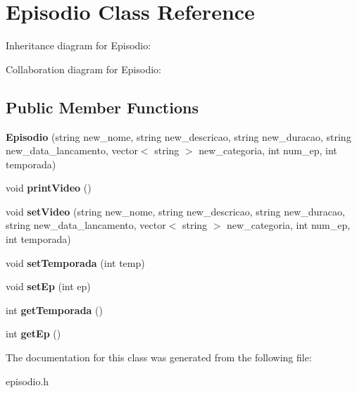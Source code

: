 \hypertarget{classEpisodio}{}\section{Episodio Class Reference}
\label{classEpisodio}


Inheritance diagram for Episodio\+:


Collaboration diagram for Episodio\+:
\subsection*{Public Member Functions}
\begin{DoxyCompactItemize}
\item 
{\bfseries Episodio} (string new\+\_\+nome, string new\+\_\+descricao, string new\+\_\+duracao, string new\+\_\+data\+\_\+lancamento, vector$<$ string $>$ new\+\_\+categoria, int num\+\_\+ep, int temporada)\hypertarget{classEpisodio_a7199e4c7437ac5c665b0c2db28b6f186}{}\label{classEpisodio_a7199e4c7437ac5c665b0c2db28b6f186}

\item 
void {\bfseries print\+Video} ()\hypertarget{classEpisodio_a3d6959da1975f9849d8de7e07af31637}{}\label{classEpisodio_a3d6959da1975f9849d8de7e07af31637}

\item 
void {\bfseries set\+Video} (string new\+\_\+nome, string new\+\_\+descricao, string new\+\_\+duracao, string new\+\_\+data\+\_\+lancamento, vector$<$ string $>$ new\+\_\+categoria, int num\+\_\+ep, int temporada)\hypertarget{classEpisodio_ab5de83b34f3027785175055a16753cfe}{}\label{classEpisodio_ab5de83b34f3027785175055a16753cfe}

\item 
void {\bfseries set\+Temporada} (int temp)\hypertarget{classEpisodio_a44157fed128d0e26e01937aae390dbbd}{}\label{classEpisodio_a44157fed128d0e26e01937aae390dbbd}

\item 
void {\bfseries set\+Ep} (int ep)\hypertarget{classEpisodio_a72b5927f9a19845fce58fd5e7287de76}{}\label{classEpisodio_a72b5927f9a19845fce58fd5e7287de76}

\item 
int {\bfseries get\+Temporada} ()\hypertarget{classEpisodio_a71805a76e89736cb8baea2f110d075c6}{}\label{classEpisodio_a71805a76e89736cb8baea2f110d075c6}

\item 
int {\bfseries get\+Ep} ()\hypertarget{classEpisodio_ab36d7a9f41320519d28c8cb06004b60f}{}\label{classEpisodio_ab36d7a9f41320519d28c8cb06004b60f}

\end{DoxyCompactItemize}


The documentation for this class was generated from the following file\+:\begin{DoxyCompactItemize}
\item 
episodio.\+h\end{DoxyCompactItemize}
